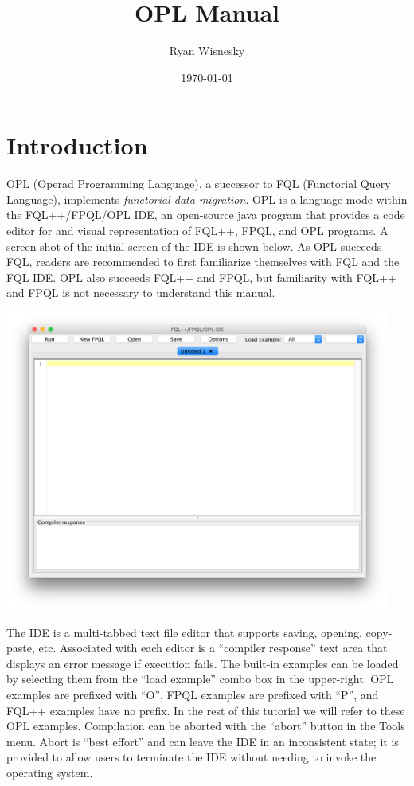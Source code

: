 \documentclass[12pt]{article}
\begin{document}
\title{OPL Manual}
\author{Ryan Wisnesky}
\date{\today}

\maketitle

\vspace{-0.5in}

\begin{footnotesize}
\tableofcontents
\end{footnotesize}
\newpage

\section{Introduction}

OPL (Operad Programming Language), a successor to FQL (Functorial Query Language), implements {\it functorial data migration}.  OPL is a language mode within the FQL++/FPQL/OPL IDE, an open-source java program that provides a code editor for and visual representation of FQL++, FPQL, and OPL programs.  A screen shot of the initial screen of the IDE is shown below.  As OPL succeeds FQL, readers are recommended to first familiarize themselves with FQL and the FQL IDE.  OPL also succeeds FQL++ and FPQL, but familiarity with FQL++ and FPQL is not necessary to understand this manual.

\begin{center}
\includegraphics[width=5in]{initial}
\end{center}

The IDE is a multi-tabbed text file editor that supports saving, opening, copy-paste, etc.  Associated with each editor is a ``compiler response'' text area that displays an error message if execution fails.  The built-in examples can be loaded by selecting them from the ``load example'' combo box in the upper-right.  OPL examples are prefixed with ``O'', FPQL examples are prefixed with ``P'', and FQL++ examples have no prefix.  In the rest of this tutorial we will refer to these OPL examples.  Compilation can be aborted with the ``abort'' button in the Tools menu.  Abort is ``best effort'' and can leave the IDE in an inconsistent state; it is provided to allow users to terminate the IDE without needing to invoke the operating system.  
\end{document}
